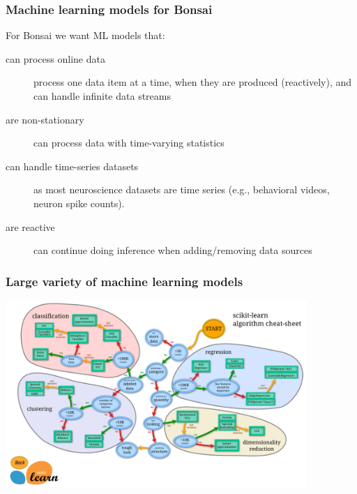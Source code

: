 \begin{frame}
    \frametitle{Machine learning models for Bonsai}

    For Bonsai we want ML models that:

    \begin{description}

        \item[can process online data] process one data item at a time, when they are produced (reactively), and can handle infinite data streams

        \item[are non-stationary] can process data with time-varying statistics

        \item[can handle time-series datasets] as most neuroscience datasets are time series (e.g., behavioral videos, neuron spike counts).

        \item[are reactive] can continue doing inference when adding/removing data sources

    \end{description}

\end{frame}

\begin{frame}
    \frametitle{Large variety of machine learning models}

    \begin{center}
        \includegraphics[width=4.5in]{figures/ml_map.png}
    \end{center}

\end{frame}

